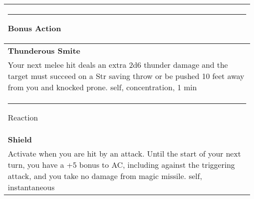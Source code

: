 \documentclass[twocolumn]{article}
\begin{document}
\\
\noindent\begin{tabular}{|m{3.1in}|}
\hline
\rule{1.1in}{0pt}Bonus Action\\
\hline
\textbf{Thunderous Smite}\\
Your next melee hit deals an extra 2d6 thunder damage and the target must succeed on a Str saving throw or be pushed 10 feet away from you and knocked prone. {\sc self, concentration, 1 min}\\
\hline
\rule{1.2in}{0pt}Reaction\\
\hline
\textbf{Shield}\\
Activate when you are hit by an attack. Until the start of your next turn, you have a +5 bonus to AC, including against the triggering attack, and you take no damage from magic missile. {\sc self, instantaneous}\\
\hline
\end{tabular}
\vspace{8pt}
\end{document}
